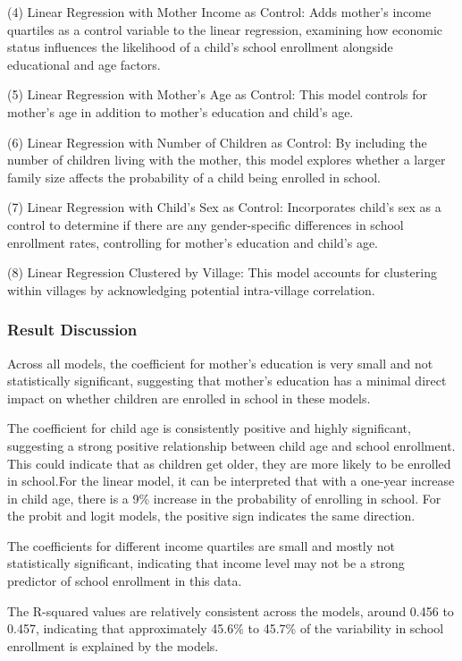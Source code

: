 \documentclass[10pt]{article}
\begin{document}
(4) Linear Regression with Mother Income as Control: Adds mother's income quartiles as a control variable to the linear regression, examining how economic status influences the likelihood of a child's school enrollment alongside educational and age factors.

(5) Linear Regression with Mother's Age as Control: This model controls for mother's age in addition to mother's education and child's age.

(6) Linear Regression with Number of Children as Control: By including the number of children living with the mother, this model explores whether a larger family size affects the probability of a child being enrolled in school.

(7) Linear Regression with Child's Sex as Control: Incorporates child's sex as a control to determine if there are any gender-specific differences in school enrollment rates, controlling for mother's education and child's age.

(8) Linear Regression Clustered by Village: This model accounts for clustering within villages by acknowledging potential intra-village correlation.

\subsubsection{Result Discussion}

Across all models, the coefficient for mother's education is very small and not statistically significant,  suggesting that mother's education has a minimal direct impact on whether children are enrolled in school in these models.

The coefficient for child age is consistently positive and highly significant, suggesting a strong positive relationship between child age and school enrollment. This could indicate that as children get older, they are more likely to be enrolled in school.For the linear model, it can be interpreted that with a one-year increase in child age, there is a 9\% increase in the probability of enrolling in school. For the probit and logit models, the positive sign indicates the same direction.

The coefficients for different income quartiles are small and mostly not statistically significant, indicating that income level may not be a strong predictor of school enrollment in this data.

 The R-squared values are relatively consistent across the models, around 0.456 to 0.457, indicating that approximately 45.6\% to 45.7\% of the variability in school enrollment is explained by the models. 
\end{document}
